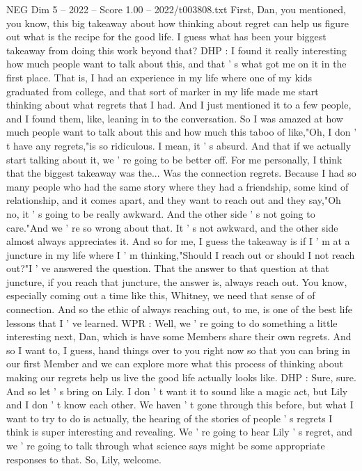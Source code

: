 \begin{textsample}{NEG Dim 5 – 2022 – Score 1.00 – 2022/t003808.txt}
First, Dan, you mentioned, you know, this big takeaway about how thinking about regret can help us figure out what is the recipe for the good life.
I guess what has been your biggest takeaway from doing this work beyond that?
DHP : I found it really interesting how much people want to talk about this, and that ' s what got me on it in the first place.
That is, I had an experience in my life where one of my kids graduated from college, and that sort of marker in my life made me start thinking about what regrets that I had.
And I just mentioned it to a few people, and I found them, like, leaning in to the conversation.
So I was amazed at how much people want to talk about this and how much this taboo of like,"Oh, I don ' t have any regrets,"is so ridiculous.
I mean, it ' s absurd.
And that if we actually start talking about it, we ' re going to be better off.
For me personally, I think that the biggest takeaway was the...
Was the connection regrets.
Because I had so many people who had the same story where they had a friendship, some kind of relationship, and it comes apart, and they want to reach out and they say,"Oh no, it ' s going to be really awkward.
And the other side ' s not going to care."And we ' re so wrong about that.
It ' s not awkward, and the other side almost always appreciates it.
And so for me, I guess the takeaway is if I ' m at a juncture in my life where I ' m thinking,"Should I reach out or should I not reach out?"I ' ve answered the question.
That the answer to that question at that juncture, if you reach that juncture, the answer is, always reach out.
You know, especially coming out a time like this, Whitney, we need that sense of of connection.
And so the ethic of always reaching out, to me, is one of the best life lessons that I ' ve learned.
WPR : Well, we ' re going to do something a little interesting next, Dan, which is have some Members share their own regrets.
And so I want to, I guess, hand things over to you right now so that you can bring in our first Member and we can explore more what this process of thinking about making our regrets help us live the good life actually looks like.
DHP : Sure, sure.
And so let ' s bring on Lily.
I don ' t want it to sound like a magic act, but Lily and I don ' t know each other.
We haven ' t gone through this before, but what I want to try to do is actually, the hearing of the stories of people ' s regrets I think is super interesting and revealing.
We ' re going to hear Lily ' s regret, and we ' re going to talk through what science says might be some appropriate responses to that.
So, Lily, welcome.

\end{textsample}
